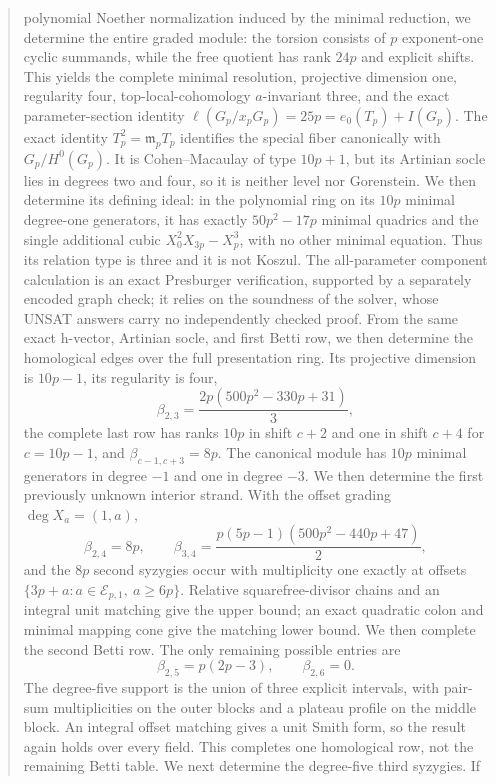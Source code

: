\documentclass[11pt]{article}
\theoremstyle{definition}
\theoremstyle{remark}
\begin{document}
\begin{abstract}
polynomial Noether normalization induced by the minimal reduction, we determine the entire graded
module: the torsion consists of $p$ exponent-one cyclic summands, while the free quotient has rank
$24p$ and explicit shifts. This yields the complete minimal resolution, projective dimension one,
regularity four, top-local-cohomology $a$-invariant three, and the exact parameter-section identity
$\ell(G_p/x_pG_p)=25p=e_0(T_p)+I(G_p)$. The exact identity
$T_p^2=\mathfrak m_pT_p$ identifies the special fiber canonically with
$G_p/H^0(G_p)$. It is Cohen--Macaulay of type $10p+1$, but its Artinian socle lies in degrees two
and four, so it is neither level nor Gorenstein. We then determine its defining ideal: in the
polynomial ring on its $10p$ minimal degree-one generators, it has exactly $50p^2-17p$ minimal
quadrics and the single additional cubic $X_0^2X_{3p}-X_p^3$, with no other minimal equation.
Thus its relation type is three and it is not Koszul. The all-parameter component calculation is
an exact Presburger verification, supported by a separately encoded graph check; it relies on the
soundness of the solver, whose UNSAT answers carry no independently checked proof. From the same
exact h-vector, Artinian socle, and first Betti row, we then determine the homological edges over
the full presentation ring. Its projective dimension is $10p-1$, its regularity is four,
\[
\beta_{2,3}=\frac{2p(500p^2-330p+31)}{3},
\]
the complete last row has ranks $10p$ in shift $c+2$ and one in shift $c+4$ for
$c=10p-1$, and $\beta_{c-1,c+3}=8p$. The canonical module has $10p$ minimal generators in
degree $-1$ and one in degree $-3$. We then determine the first previously unknown interior
strand. With the offset grading $\deg X_a=(1,a)$,
\[
\beta_{2,4}=8p,
\qquad
\beta_{3,4}=\frac{p(5p-1)(500p^2-440p+47)}{2},
\]
and the $8p$ second syzygies occur with multiplicity one exactly at offsets
$\{3p+a:a\in\mathcal E_{p,1},\ a\ge6p\}$. Relative squarefree-divisor chains and an integral
unit matching give the upper bound; an exact quadratic colon and minimal mapping cone give the
matching lower bound. We then complete the second Betti row. The only remaining possible entries
are
\[
\beta_{2,5}=p(2p-3),\qquad \beta_{2,6}=0.
\]
The degree-five support is the union of three explicit intervals, with pair-sum multiplicities on
the outer blocks and a plateau profile on the middle block. An integral offset matching gives a
unit Smith form, so the result again holds over every field. This completes one homological row,
  not the remaining Betti table. We next determine the degree-five third syzygies. If

\end{abstract}
\end{document}
